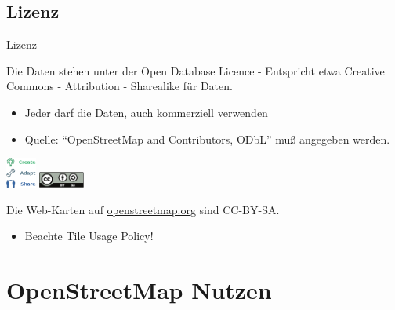 \documentclass{beamer}
\begin{document}
\hypersetup{urlcolor=blue}


\subsection{Lizenz}

\begin{frame}{Lizenz}

Die Daten stehen unter der Open Database Licence - Entspricht etwa Creative Commons - Attribution - Sharealike für Daten.
\begin{itemize}
  \item Jeder darf die Daten, auch kommerziell verwenden
  \item Quelle: "`OpenStreetMap and Contributors, ODbL"' muß angegeben werden.
\end{itemize}

 \begin{center}
 \includegraphics[width=1cm]{ODbL.png}
 \hspace{2cm}
 \includegraphics[width=1.5cm]{cc-by-sa.pdf}
 \end{center}

\pause
Die Web-Karten auf \href{http://osm.org}{openstreetmap.org} sind CC-BY-SA.
\begin{itemize}
  \item Beachte Tile Usage Policy!
\end{itemize}


\end{frame}









\section{OpenStreetMap Nutzen}
\end{document}
